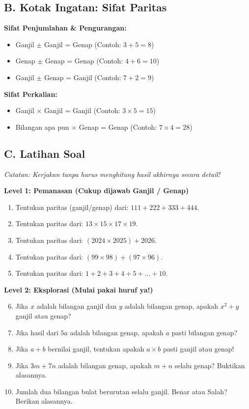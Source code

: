 \documentclass[11pt,a4paper]{article}
\begin{document}
\subsection*{B. Kotak Ingatan: Sifat Paritas}
\begin{tcolorbox}
\textbf{Sifat Penjumlahan \& Pengurangan:}
\begin{itemize}
    \item Ganjil $\pm$ Ganjil = Genap (Contoh: $3 + 5 = 8$)
    \item Genap $\pm$ Genap = Genap (Contoh: $4 + 6 = 10$)
    \item Ganjil $\pm$ Genap = Ganjil (Contoh: $7 + 2 = 9$)
\end{itemize}

\textbf{Sifat Perkalian:}
\begin{itemize}
    \item Ganjil $\times$ Ganjil = Ganjil (Contoh: $3 \times 5 = 15$)
    \item Bilangan apa pun $\times$ Genap = Genap (Contoh: $7 \times 4 = 28$)
\end{itemize}
\end{tcolorbox}

\subsection*{C. Latihan Soal}
\textit{Catatan: Kerjakan tanpa harus menghitung hasil akhirnya secara detail!}

\textbf{Level 1: Pemanasan (Cukup dijawab Ganjil / Genap)}
\begin{enumerate}
    \item Tentukan paritas (ganjil/genap) dari: $111 + 222 + 333 + 444$.
    \item Tentukan paritas dari: $13 \times 15 \times 17 \times 19$.
    \item Tentukan paritas dari: $(2024 \times 2025) + 2026$.
    \item Tentukan paritas dari: $(99 \times 98) + (97 \times 96)$.
    \item Tentukan paritas dari: $1 + 2 + 3 + 4 + 5 + \dots + 10$.
\end{enumerate}

\textbf{Level 2: Eksplorasi (Mulai pakai huruf ya!)}
\begin{enumerate}
    \setcounter{enumi}{5}
    \item Jika $x$ adalah bilangan ganjil dan $y$ adalah bilangan genap, apakah $x^2 + y$ ganjil atau genap?
    \item Jika hasil dari $5a$ adalah bilangan genap, apakah $a$ pasti bilangan genap?
    \item Jika $a+b$ bernilai ganjil, tentukan apakah $a \times b$ pasti ganjil atau genap!
    \item Jika $3m + 7n$ adalah bilangan genap, apakah $m+n$ selalu genap? Buktikan alasannya.
    \item Jumlah dua bilangan bulat berurutan selalu ganjil. Benar atau Salah? Berikan alasannya.
\end{enumerate}
\end{document}
